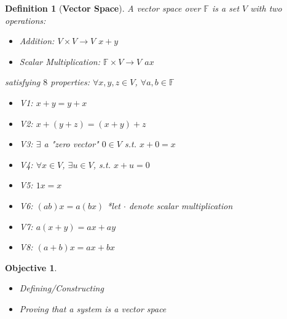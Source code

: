 \documentclass[12pt]{article}
\theoremstyle{plain}
\newtheorem{definition}{Definition}[subsection]
\newtheorem{objective}{Objective}[subsection]
\begin{document}
	\begin{definition}[\textbf{Vector Space}]
		A vector space over $\mathbb{F}$ is a set $V$ with two operations: 
		\begin{itemize}
			\item Addition: $V\times V \to V$ $x + y$
			\item Scalar Multiplication: $\mathbb{F} \times V \to V$ $ax$
		\end{itemize}
		satisfying $8$ properties: $\forall x, y, z \in V$, $\forall a,b\in 
		\mathbb{F}$
		\begin{itemize}
			\item V1: $x + y = y + x$ 
			\item V2: $x + (y + z) = (x+ y) + z$
			\item V3: $\exists$ a "zero vector" $0\in V $ s.t. $x+0=x$ 
			\item V4: $\forall x\in V$, $\exists u\in V$, s.t. $x+u=0$
			\item V5: $1 x=x$ 
			\item V6: $(ab) x = a(bx)$ 
					*let $\cdot$ denote scalar multiplication
			\item V7: $a(x+y) = ax+ay$		
			\item V8: $(a+b)x = ax+bx$\\
		\end{itemize}
	\end{definition}

	\begin{objective}
		$ $
		\begin{itemize}
		\item Defining/Constructing 
		\item Proving that a system is a vector space\\
		\end{itemize}
	\end{objective}
\end{document}
